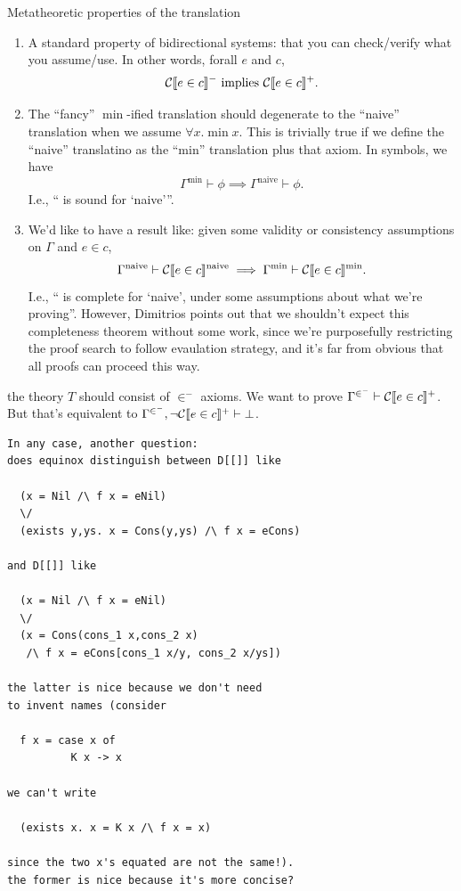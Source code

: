 \documentclass[preprint]{sigplanconf}
\begin{document}
Metatheoretic properties of the translation
\begin{enumerate}
\item A standard
  property of bidirectional systems: that you can check/verify what you assume/use.
  In other words, forall $e$ and $c$,
  \protect \[
  \mathcal{C} \llbracket e \in c \rrbracket^- \text{ implies } \mathcal{C} \llbracket e \in c \rrbracket^+.
  \]
\item The ``fancy'' $\min{}$-ified translation should 
  degenerate to the ``naive'' translation when we assume $\forall x. \min{x}$.
  This is trivially true if we define the ``naive'' translatino as the ``min'' translation
  plus that axiom.  In symbols, we have
  \protect \[
  \Gamma^\text{min} \vdash \phi \implies \Gamma^\text{naive} \vdash \phi.
  \]  I.e., ``\min{} is sound for `naive'''.
\item We'd like to have a result  like: given some validity or consistency 
  assumptions on $\Gamma$ and $e \in c$,
  \[
    \Gamma^\text{naive} \vdash \mathcal{C} \llbracket e \in c \rrbracket^\text{naive} \implies \Gamma^\text{min} \vdash \mathcal{C} \llbracket e \in c \rrbracket^\text{min}.
  \]  I.e., ``\min{} is complete for `naive', under some assumptions about 
  what we're proving''.  However, Dimitrios points out that we shouldn't expect this
  completeness theorem without some work, since we're purposefully 
  restricting the proof search to follow
  evaulation strategy, and it's far from obvious that all proofs can proceed this way.
\end{enumerate}

  the theory $T$ should consist of $\in^-$ axioms.
  We want to prove $\Gamma^{\in^-} \vdash \mathcal{C} \llbracket e \in c \rrbracket^+$.  
  But
  that's equivalent to $\Gamma^{\in^-},\lnot\mathcal{C} \llbracket e \in c \rrbracket^+ \vdash \bot$.  


\begin{verbatim}
In any case, another question: 
does equinox distinguish between D[[]] like

  (x = Nil /\ f x = eNil)
  \/
  (exists y,ys. x = Cons(y,ys) /\ f x = eCons)

and D[[]] like

  (x = Nil /\ f x = eNil)
  \/
  (x = Cons(cons_1 x,cons_2 x)
   /\ f x = eCons[cons_1 x/y, cons_2 x/ys])

the latter is nice because we don't need 
to invent names (consider

  f x = case x of
          K x -> x

we can't write

  (exists x. x = K x /\ f x = x)

since the two x's equated are not the same!). 
the former is nice because it's more concise?
\end{verbatim}
\end{document}
